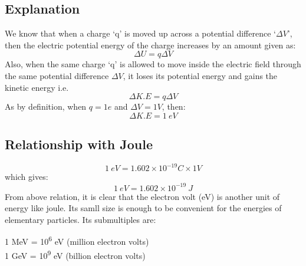 \subsection*{Explanation}
We know that when a charge ‘q’ is moved up across a potential difference
‘$\Delta V$’, then the electric potential energy of the charge increases
by an amount given as:
\begin{equation}
  \Delta U = q\Delta V
\end{equation}
Also, when the same charge ‘q’ is allowed to move inside the electric
field through the same potential difference $\Delta V$,
it loses its potential energy and gains the kinetic energy i.e.
\begin{equation}
  \Delta K.E = q\Delta V
\end{equation}
As by definition, when $q = 1e$ and $\Delta V = 1 V$, then:
\begin{equation}
  \Delta K.E = 1\:eV
\end{equation}
\subsection*{Relationship with Joule}
\begin{equation}
  1\:eV = 1.602\times 10^{-19}C \times 1 V
\end{equation}
which gives:
\begin{equation}
  1\:eV = 1.602\times 10^{-19}\:J
\end{equation}
From above relation, it is clear that the electron volt (eV) is another
unit of energy like joule. Its samll size is enough to be convenient for the energies of elementary particles.
Its submultiples are:
\begin{center}
1 MeV = 10\textsuperscript{6} eV (million electron volts)\\
1 GeV = 10\textsuperscript{9} eV (billion electron volts)
\end{center}

